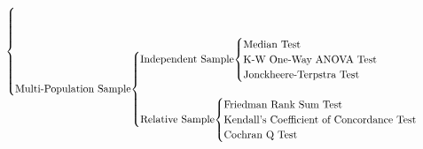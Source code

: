 \begin{equation*}
{\begin{cases}
            \\
            \\
            \\
        \text{Multi-Population Sample}
            \smash[b]{
                \begin{cases}
                    \text{Independent Sample}
                    \smash[t]{
                        \begin{cases}
                            \text{Median Test}\\
                            \text{K-W One-Way ANOVA Test}\\
                            \text{Jonckheere-Terpstra Test}
                        \end{cases}
                    }\\
                    \\
                    \text{Relative Sample}
                    \smash[b]{
                        \begin{cases}
                            \text{Friedman Rank Sum Test}\\
                            \text{Kendall's Coefficient of Concordance Test}\\
                            \text{Cochran Q Test}
                        \end{cases}
                    }
                \end{cases}
            }
    \end{cases}  
    }
\end{equation*}
